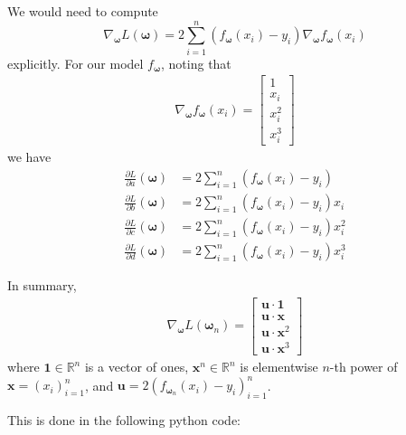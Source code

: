 \documentclass[
]{article}
\newcommand{\1}{\boldsymbol{1}}
\begin{document}
We would need to compute \[
\nabla_{\boldsymbol{\omega}} L(\boldsymbol{\omega}) = 2 \sum_{i=1}^{n} (f_{\boldsymbol{\omega}}(x_i) - y_i) \nabla_{\boldsymbol{\omega}} f_{\boldsymbol{\omega}}(x_i)
\] explicitly. For our model \(f_{\boldsymbol{\omega}}\), noting that
\begin{align*}
    \nabla_{\boldsymbol{\omega}} f_{\boldsymbol{\omega}}(x_i) = \begin{bmatrix} 1 \\ x_i \\ x_i^2 \\ x_i^3 \end{bmatrix} 
\end{align*} we have \begin{align*}
    \frac{\partial L}{\partial a}(\boldsymbol{\omega}) & = 2 \sum_{i=1}^{n} (f_{\boldsymbol{\omega}}(x_i) - y_i)
    \\
    \frac{\partial L}{\partial b}(\boldsymbol{\omega}) &= 2 \sum_{i=1}^{n} (f_{\boldsymbol{\omega}}(x_i) - y_i) x_i
    \\
    \frac{\partial L}{\partial c}(\boldsymbol{\omega}) &= 2 \sum_{i=1}^{n} (f_{\boldsymbol{\omega}}(x_i) - y_i) x_i^2
    \\
    \frac{\partial L}{\partial d}(\boldsymbol{\omega}) &= 2 \sum_{i=1}^{n} ( f_{\boldsymbol{\omega}}(x_i) - y_i) x_i^3
\end{align*}

In summary, \begin{align*}
    \nabla_{\boldsymbol{\omega}} L(\boldsymbol{\omega}_n) = \begin{bmatrix} \mathbf{u}\cdot \boldsymbol{1} \\ \mathbf{u}\cdot \mathbf{x}\\ \mathbf{u}\cdot \mathbf{x}^2 \\ \mathbf{u}\cdot \mathbf{x}^3 \end{bmatrix} 
\end{align*} where \(\boldsymbol{1} \in \mathbb{R}^n\) is a vector of
ones, \(\mathbf{x}^n \in \mathbb{R}^n\) is elementwise \(n\)-th power of
\(\mathbf{x}= (x_i)_{i=1}^n\), and
\(\mathbf{u}= 2 (f_{\boldsymbol{\omega}_n}(x_i) - y_i)_{i=1}^n\).

This is done in the following python code:
\end{document}
